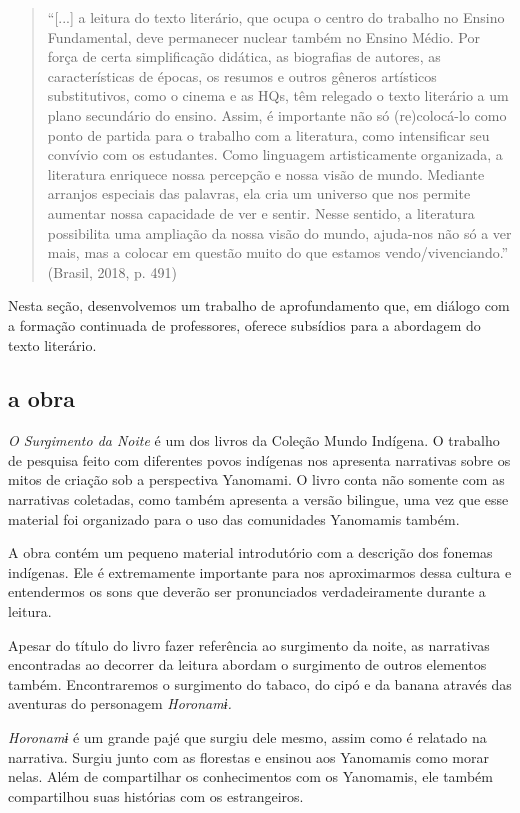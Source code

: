 \documentclass[12pt]{extarticle}
\begin{document}
\begin{quote}
``{[}...{]} a leitura do texto literário, que ocupa o centro do trabalho
no Ensino Fundamental, deve permanecer nuclear também no Ensino Médio.
Por força de certa simplificação didática, as biografias de autores, as
características de épocas, os resumos e outros gêneros artísticos
substitutivos, como o cinema e as HQs, têm relegado o texto literário a
um plano secundário do ensino. Assim, é importante não só (re)colocá-lo
como ponto de partida para o trabalho com a literatura, como
intensificar seu convívio com os estudantes. Como linguagem
artisticamente organizada, a literatura enriquece nossa percepção e
nossa visão de mundo. Mediante arranjos especiais das palavras, ela cria
um universo que nos permite aumentar nossa capacidade de ver e sentir.
Nesse sentido, a literatura possibilita uma ampliação da nossa visão do
mundo, ajuda-nos não só a ver mais, mas a colocar em questão muito do
que estamos vendo/vivenciando.'' (Brasil, 2018, p. 491)
\end{quote}

Nesta seção, desenvolvemos um trabalho de aprofundamento que, em diálogo
com a formação continuada de professores, oferece subsídios para a
abordagem do texto literário.

\subsection{a obra}

\emph{O Surgimento da Noite} é um dos livros da Coleção Mundo Indígena.
O trabalho de pesquisa feito com diferentes povos indígenas nos
apresenta narrativas sobre os mitos de criação sob a perspectiva
Yanomami. O livro conta não somente com as narrativas coletadas, como
também apresenta a versão bilingue, uma vez que esse material foi
organizado para o uso das comunidades Yanomamis também.

A obra contém um pequeno material introdutório com a descrição dos
fonemas indígenas. Ele é extremamente importante para nos aproximarmos
dessa cultura e entendermos os sons que deverão ser pronunciados
verdadeiramente durante a leitura.

Apesar do título do livro fazer referência ao surgimento da noite, as
narrativas encontradas ao decorrer da leitura abordam o surgimento de
outros elementos também. Encontraremos o surgimento do tabaco, do cipó e
da banana através das aventuras do personagem \emph{Horonamɨ.}

\emph{Horonamɨ} é um grande pajé que surgiu dele mesmo, assim como é
relatado na narrativa. Surgiu junto com as florestas e ensinou aos
Yanomamis como morar nelas. Além de compartilhar os conhecimentos com os
Yanomamis, ele também compartilhou suas histórias com os estrangeiros.
\end{document}
